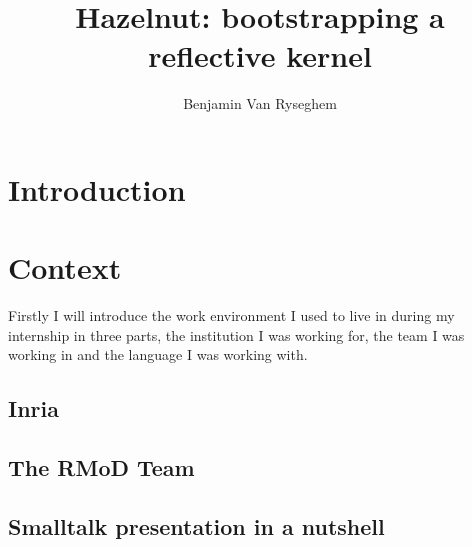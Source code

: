 \documentclass{book}
\begin{document}
\makeatother

\title{Hazelnut: bootstrapping a reflective kernel}
\author{Benjamin Van Ryseghem}



\newpage






\newpage


\tableofcontents

\newpage



\chapter{Introduction}

	

\chapter{Context}

Firstly I will introduce the work environment I used to live in during my internship in three parts, the institution I was working for, the team I was working in and the language I was working with.

	\section{Inria}
	\section{The RMoD Team}
	\section{Smalltalk presentation in a nutshell}
\end{document}

